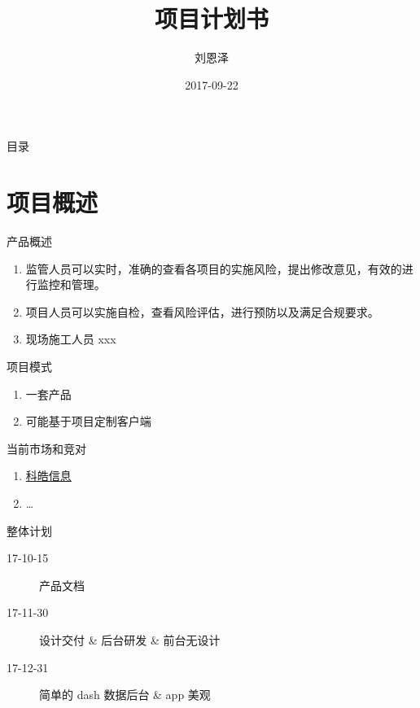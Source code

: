 \documentclass[presentation, bigger]{beamer}
\author{刘恩泽}
\date{2017-09-22}
\title{项目计划书}
\begin{document}
\maketitle
\begin{frame}{目录}
\tableofcontents
\end{frame}


\section{项目概述}
\label{sec:orgf845e92}
\begin{frame}[label={sec:orgda1e39d}]{产品概述}
\begin{enumerate}
\item 监管人员可以实时，准确的查看各项目的实施风险，提出修改意见，有效的进行监控和管理。
\item 项目人员可以实施自检，查看风险评估，进行预防以及满足合规要求。
\item 现场施工人员 xxx
\end{enumerate}
\end{frame}
\begin{frame}[label={sec:org10dc243}]{项目模式}
\begin{enumerate}
\item 一套产品
\item 可能基于项目定制客户端
\end{enumerate}
\end{frame}

\begin{frame}[label={sec:org2965479}]{当前市场和竞对}
\begin{enumerate}
\item \href{http://www.kehaoinfo.com/}{科皓信息}
\item \ldots{}
\end{enumerate}
\end{frame}

\begin{frame}[label={sec:org29d5b20}]{整体计划}
\begin{description}
\item[{17-10-15}] 产品文档
\item[{17-11-30}] 设计交付 \& 后台研发 \& 前台无设计
\item[{17-12-31}] 简单的 dash 数据后台 \& app 美观
\end{description}
\end{frame}
\end{document}
